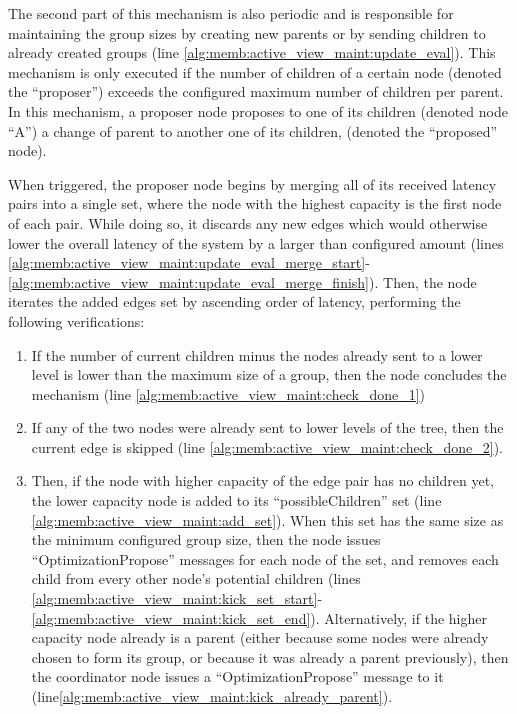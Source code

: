 The second part of this mechanism is also periodic and is responsible for maintaining the group sizes by creating new parents or by sending children to already created groups (line \ref{alg:memb:active_view_maint:update_eval}). This mechanism is only executed if the number of children of a certain node (denoted the ``proposer'') exceeds the configured maximum number of children per parent. In this mechanism, a proposer node proposes to one of its children (denoted node ``A'') a change of parent to another one of its children, (denoted the ``proposed'' node).


When triggered, the proposer node begins by merging all of its received latency pairs into a single set, where the node with the highest capacity is the first node of each pair. While doing so, it discards any new edges which would otherwise lower the overall latency of the system by a larger than configured amount (lines \ref{alg:memb:active_view_maint:update_eval_merge_start}-\ref{alg:memb:active_view_maint:update_eval_merge_finish}). Then, the node iterates the added edges set by ascending order of latency, performing the following verifications:

\begin{enumerate}
    \item If the number of current children minus the nodes already sent to a lower level is lower than the maximum size of a group, then the node concludes the mechanism (line \ref{alg:memb:active_view_maint:check_done_1})
    
    \item If any of the two nodes were already sent to lower levels of the tree, then the current edge is skipped (line \ref{alg:memb:active_view_maint:check_done_2}).
    
    \item Then, if the node with higher capacity of the edge pair has no children yet, the lower capacity node is added to its ``possibleChildren'' set (line \ref{alg:memb:active_view_maint:add_set}). When this set has the same size as the minimum configured group size, then the node issues ``OptimizationPropose'' messages for each node of the set, and removes each child from every other node's potential children (lines \ref{alg:memb:active_view_maint:kick_set_start}-\ref{alg:memb:active_view_maint:kick_set_end}). Alternatively, if the higher capacity node already is a parent (either because some nodes were already chosen to form its group, or because it was already a parent previously), then the coordinator node issues a ``OptimizationPropose'' message to it (line\ref{alg:memb:active_view_maint:kick_already_parent}).
\end{enumerate}

